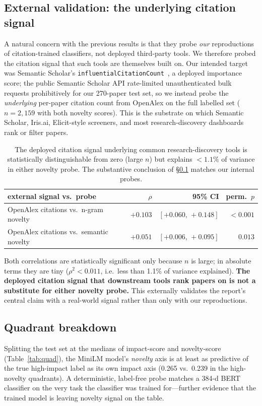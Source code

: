 \documentclass[conference]{IEEEtran}
\begin{document}
\subsection{External validation: the underlying citation signal}\label{sec:external}
A natural concern with the previous results is that they probe \emph{our} reproductions of citation-trained classifiers, not deployed third-party tools. We therefore probed the citation signal that such tools are themselves built on. Our intended target was Semantic Scholar's \texttt{influentialCitationCount}~\cite{valenzuela2015identifying}, a deployed importance score; the public Semantic Scholar API rate-limited unauthenticated bulk requests prohibitively for our 270-paper test set, so we instead probe the \emph{underlying} per-paper citation count from OpenAlex on the full labelled set ($n=2{,}159$ with both novelty scores). This is the substrate on which Semantic Scholar, Iris.ai, Elicit-style screeners, and most research-discovery dashboards rank or filter papers.

\begin{table}[h]\centering\small
\begin{tabular}{lrrr}
\toprule
external signal vs.\ probe & $\rho$ & 95\% CI & perm.\ $p$ \\
\midrule
OpenAlex citations vs.\ n-gram novelty   & $+0.103$ & $[+0.060,\,+0.148]$ & $<\!0.001$ \\
OpenAlex citations vs.\ semantic novelty & $+0.051$ & $[+0.006,\,+0.095]$ & $0.013$ \\
\bottomrule
\end{tabular}
\caption{The deployed citation signal underlying common research-discovery tools is statistically distinguishable from zero (large $n$) but explains $<\!1.1\%$ of variance in either novelty probe. The substantive conclusion of \S\ref{sec:external} matches our internal probes.}
\label{tab:external}
\end{table}

Both correlations are statistically significant only because $n$ is large; in absolute terms they are tiny ($\rho^2 < 0.011$, i.e.\ less than 1.1\% of variance explained). \textbf{The deployed citation signal that downstream tools rank papers on is not a substitute for either novelty probe.} This externally validates the report's central claim with a real-world signal rather than only with our reproductions.

\subsection{Quadrant breakdown}
Splitting the test set at the medians of impact-score and novelty-score (Table~\ref{tab:quad}), the MiniLM model's \emph{novelty} axis is at least as predictive of the true high-impact label as its own impact axis (0.265 vs.\ 0.239 in the high-novelty quadrants). A deterministic, label-free probe matches a 384-d BERT classifier on the very task the classifier was trained for---further evidence that the trained model is leaving novelty signal on the table.
\end{document}
